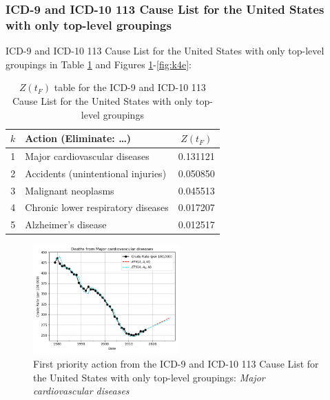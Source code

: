 \documentclass[10pt, a4paper, twocolumn]{IEEEconf}
\begin{document}
\clearpage

\subsubsection{ICD-9 and ICD-10 113 Cause List for the United States with only top-level groupings}

ICD-9 and ICD-10 113 Cause List for the United States with only top-level groupings in Table \ref{table:ztable3} and Figures \ref{fig:k4a}-\ref{fig:k4e}:

\begin{table}[H]
  \centering
  \begin{tabular}{clc}
    \toprule
      $k$ & Action (Eliminate: \ldots) & $Z(t_F)$ \\
    \midrule
      1 &      Major cardiovascular diseases & 0.131121 \\
      2 & Accidents (unintentional injuries) & 0.050850 \\
      3 &                Malignant neoplasms & 0.045513 \\
      4 & Chronic lower respiratory diseases & 0.017207 \\
      5 &                Alzheimer's disease & 0.012517 \\
    \bottomrule
  \end{tabular}
  \caption{$Z(t_F)$ table for the ICD-9 and ICD-10 113 Cause List for the United States with only top-level groupings}
  \label{table:ztable3}
\end{table}

\begin{figure}[H]
  \centering
  \includegraphics[width=0.5\textwidth]{results/US_ICD_113_SELECTED_CAUSES_ROOTS/Major_cardiovascular_diseases_ets.png}
  \caption{First priority action from the ICD-9 and ICD-10 113 Cause List for the United States with only top-level groupings: \textit{Major cardiovascular diseases}}\label{fig:k4a}
\end{figure}
\end{document}
